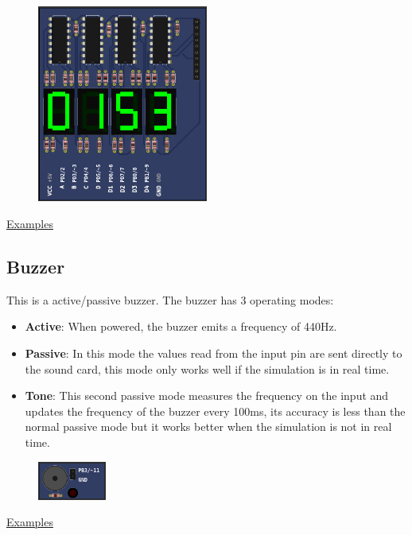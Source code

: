 \begin{figure}[H]
\center
\includegraphics[width=0.5\textwidth]{img/part_7seg_latch.png} 
\end{figure} 

\href{https://lcgamboa.github.io/picsimlab_examples/Parts.html\#7_Segments_Display_(Decoder)}{Examples}

\subsection{Buzzer}

This is a active/passive buzzer.
The buzzer has 3 operating modes: 
\begin{itemize}
\item \textbf{Active}: When powered, the buzzer emits a frequency of 440Hz. 
\item \textbf{Passive}: In this mode the values read from the input pin are sent directly to the sound card, this mode only works well if the simulation is in real time. 
\item \textbf{Tone}: This second passive mode measures the frequency on the input and updates the frequency of the buzzer every 100ms, its accuracy is less than the normal passive mode but it works better when the simulation is not in real time. 
\end{itemize}

\begin{figure}[H]
\center
\includegraphics[width=0.2\textwidth]{img/part_buzzer.png} 
\end{figure} 

\href{https://lcgamboa.github.io/picsimlab_examples/Parts.html\#Buzzer}{Examples}


